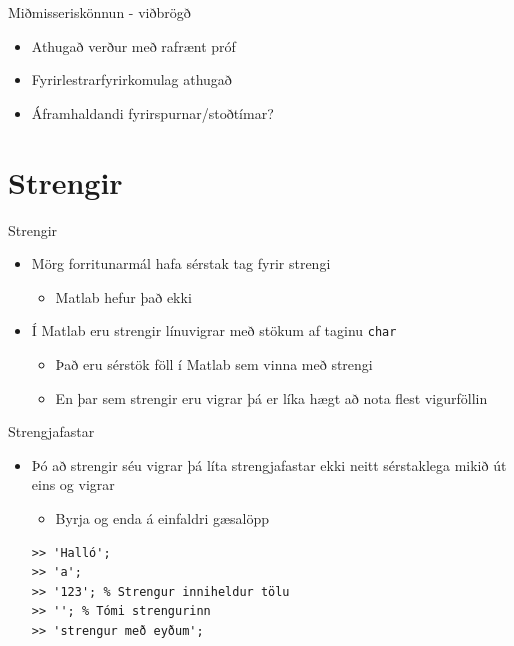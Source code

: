 \documentclass{beamer}
\begin{document}
\begin{frame}{Miðmisseriskönnun - viðbrögð}
\begin{itemize}
 \item Athugað verður með rafrænt próf
 \item Fyrirlestrarfyrirkomulag athugað
 \item Áframhaldandi fyrirspurnar/stoðtímar?
\end{itemize}
\end{frame}

\section{Strengir}

\begin{frame}{Strengir}
\begin{itemize}
 \item Mörg forritunarmál hafa sérstak tag fyrir strengi
 \begin{itemize}
  \item Matlab hefur það ekki
 \end{itemize}
 \item Í Matlab eru strengir línuvigrar með stökum af taginu \texttt{char}
 \begin{itemize}
  \item Það eru sérstök föll í Matlab sem vinna með strengi
  \item En þar sem strengir eru vigrar þá er líka hægt að nota flest vigurföllin
 \end{itemize}
\end{itemize}
\end{frame}

\begin{frame}[fragile]{Strengjafastar}
\begin{itemize}
 \item Þó að strengir séu vigrar þá líta strengjafastar ekki neitt sérstaklega mikið út eins og vigrar
 \begin{itemize}
  \item Byrja og enda á einfaldri gæsalöpp
 \end{itemize}
\begin{verbatim}
>> 'Halló';
>> 'a';
>> '123'; % Strengur inniheldur tölu
>> ''; % Tómi strengurinn
>> 'strengur með eyðum';
\end{verbatim}
\end{itemize}
\end{frame}
\end{document}
